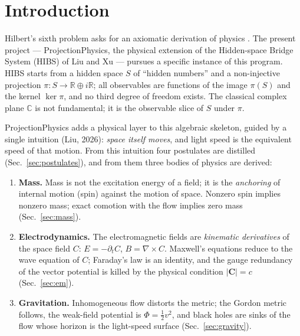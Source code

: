 \documentclass[aps,prd,preprint,superscriptaddress,amsmath,amssymb]{revtex4-2}
\begin{document}

\maketitle

\section{Introduction}\label{sec:intro}

Hilbert's sixth problem asks for an axiomatic derivation of physics
\cite{Hilbert1900}.  The present project --- ProjectionPhysics, the
physical extension of the Hidden-space Bridge System (HIBS) of Liu and Xu
\cite{LiuXu} --- pursues a specific instance of this program.  HIBS starts
from a hidden space $S$ of ``hidden numbers'' and a non-injective projection
$\pi:S\to \mathbb{R}\oplus i\mathbb{R}$; all observables are functions of the
image $\pi(S)$ and the kernel $\ker\pi$, and no third degree of freedom
exists.  The classical complex plane $\mathbb{C}$ is not fundamental; it is
the observable slice of $S$ under $\pi$.

ProjectionPhysics adds a physical layer to this algebraic skeleton, guided
by a single intuition (Liu, 2026): \emph{space itself moves}, and light
speed is the equivalent speed of that motion.  From this intuition four
postulates are distilled (Sec.~\ref{sec:postulates}), and from them three
bodies of physics are derived:

\begin{enumerate}
  \item \textbf{Mass.}  Mass is not the excitation energy of a field; it is
  the \emph{anchoring} of internal motion (spin) against the motion of
  space.  Nonzero spin implies nonzero mass; exact comotion with the flow
  implies zero mass (Sec.~\ref{sec:mass}).
  \item \textbf{Electrodynamics.}  The electromagnetic fields are
  \emph{kinematic derivatives} of the space field $C$:
  $E=-\partial_t C$, $B=\nabla\times C$.  Maxwell's equations reduce to the
  wave equation of $C$; Faraday's law is an identity, and the gauge
  redundancy of the vector potential is killed by the physical condition
  $|\bm{C}|=c$ (Sec.~\ref{sec:em}).
  \item \textbf{Gravitation.}  Inhomogeneous flow distorts the metric; the
  Gordon metric follows, the weak-field potential is $\Phi=\frac12 v^2$,
  and black holes are sinks of the flow whose horizon is the light-speed
  surface (Sec.~\ref{sec:gravity}).
\end{enumerate}
\end{document}
